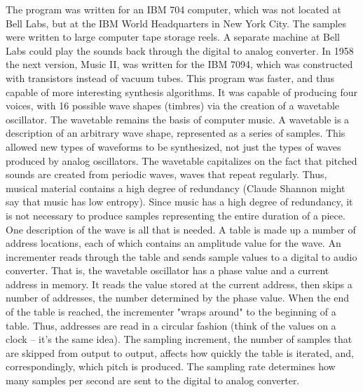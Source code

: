 The program was written for an IBM 704 computer, which was not located at Bell Labs, but at the IBM World Headquarters in New York City. The samples were written to large computer tape storage reels. A separate machine at Bell Labs could play the sounds back through the digital to analog converter. In 1958 the next version, Music II, was written for the IBM 7094, which was constructed with transistors instead of vacuum tubes. This program was faster, and thus capable of more interesting synthesis algorithms. It was capable of producing four voices, with 16 possible wave shapes (timbres) via the creation of a wavetable oscillator. The wavetable remains the basis of computer music. A wavetable is a description of an arbitrary wave shape, represented as a series of samples. This allowed new types of waveforms to be synthesized, not just the types of waves produced by analog oscillators. The wavetable capitalizes on the fact that pitched sounds are created from periodic waves, waves that repeat regularly. Thus, musical material contains a high degree of redundancy (Claude Shannon might say that music has low entropy). Since music has a high degree of redundancy, it is not necessary to produce samples representing the entire duration of a piece. One description of the wave is all that is needed. A table is made up a number of address locations, each of which contains an amplitude value for the wave. An incrementer reads through the table and sends sample values to a digital to audio converter. That is, the wavetable oscillator has a phase value and a current address in memory. It reads the value stored at the current address, then skips a number of addresses, the number determined by the phase value. When the end of the table is reached, the incrementer "wraps around" to the beginning of a table. Thus, addresses are read in a circular fashion (think of the values on a clock -- it's the same idea). The sampling increment, the number of samples that are skipped from output to output, affects how quickly the table is iterated, and, correspondingly, which pitch is produced. The sampling rate determines how many samples per second are sent to the digital to analog converter.

